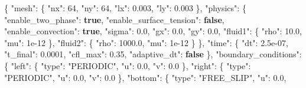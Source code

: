 \documentclass[
  10pt,
]{article}
\newenvironment{Shaded}{}{}
\newcommand{\DataTypeTok}[1]{\textcolor[rgb]{0.56,0.13,0.00}{#1}}
\newcommand{\DecValTok}[1]{\textcolor[rgb]{0.25,0.63,0.44}{#1}}
\newcommand{\FloatTok}[1]{\textcolor[rgb]{0.25,0.63,0.44}{#1}}
\newcommand{\FunctionTok}[1]{\textcolor[rgb]{0.02,0.16,0.49}{#1}}
\newcommand{\KeywordTok}[1]{\textcolor[rgb]{0.00,0.44,0.13}{\textbf{#1}}}
\newcommand{\StringTok}[1]{\textcolor[rgb]{0.25,0.44,0.63}{#1}}
\begin{document}
\begin{Shaded}
\begin{Highlighting}[]
\FunctionTok{\{}
  \DataTypeTok{"mesh"}\FunctionTok{:} \FunctionTok{\{}
    \DataTypeTok{"nx"}\FunctionTok{:} \DecValTok{64}\FunctionTok{,}
    \DataTypeTok{"ny"}\FunctionTok{:} \DecValTok{64}\FunctionTok{,}
    \DataTypeTok{"lx"}\FunctionTok{:} \FloatTok{0.003}\FunctionTok{,}
    \DataTypeTok{"ly"}\FunctionTok{:} \FloatTok{0.003}
  \FunctionTok{\},}
  \DataTypeTok{"physics"}\FunctionTok{:} \FunctionTok{\{}
    \DataTypeTok{"enable\_two\_phase"}\FunctionTok{:} \KeywordTok{true}\FunctionTok{,}
    \DataTypeTok{"enable\_surface\_tension"}\FunctionTok{:} \KeywordTok{false}\FunctionTok{,}
    \DataTypeTok{"enable\_convection"}\FunctionTok{:} \KeywordTok{true}\FunctionTok{,}
    \DataTypeTok{"sigma"}\FunctionTok{:} \FloatTok{0.0}\FunctionTok{,}
    \DataTypeTok{"gx"}\FunctionTok{:} \FloatTok{0.0}\FunctionTok{,}
    \DataTypeTok{"gy"}\FunctionTok{:} \FloatTok{0.0}\FunctionTok{,}
    \DataTypeTok{"fluid1"}\FunctionTok{:} \FunctionTok{\{}
      \DataTypeTok{"rho"}\FunctionTok{:} \FloatTok{10.0}\FunctionTok{,}
      \DataTypeTok{"mu"}\FunctionTok{:} \DecValTok{1e{-}12}
    \FunctionTok{\},}
    \DataTypeTok{"fluid2"}\FunctionTok{:} \FunctionTok{\{}
      \DataTypeTok{"rho"}\FunctionTok{:} \FloatTok{1000.0}\FunctionTok{,}
      \DataTypeTok{"mu"}\FunctionTok{:} \DecValTok{1e{-}12}
    \FunctionTok{\}}
  \FunctionTok{\},}
  \DataTypeTok{"time"}\FunctionTok{:} \FunctionTok{\{}
    \DataTypeTok{"dt"}\FunctionTok{:} \FloatTok{2.5e{-}07}\FunctionTok{,}
    \DataTypeTok{"t\_final"}\FunctionTok{:} \FloatTok{0.0001}\FunctionTok{,}
    \DataTypeTok{"cfl\_max"}\FunctionTok{:} \FloatTok{0.35}\FunctionTok{,}
    \DataTypeTok{"adaptive\_dt"}\FunctionTok{:} \KeywordTok{false}
  \FunctionTok{\},}
  \DataTypeTok{"boundary\_conditions"}\FunctionTok{:} \FunctionTok{\{}
    \DataTypeTok{"left"}\FunctionTok{:} \FunctionTok{\{}
      \DataTypeTok{"type"}\FunctionTok{:} \StringTok{"PERIODIC"}\FunctionTok{,}
      \DataTypeTok{"u"}\FunctionTok{:} \FloatTok{0.0}\FunctionTok{,}
      \DataTypeTok{"v"}\FunctionTok{:} \FloatTok{0.0}
    \FunctionTok{\},}
    \DataTypeTok{"right"}\FunctionTok{:} \FunctionTok{\{}
      \DataTypeTok{"type"}\FunctionTok{:} \StringTok{"PERIODIC"}\FunctionTok{,}
      \DataTypeTok{"u"}\FunctionTok{:} \FloatTok{0.0}\FunctionTok{,}
      \DataTypeTok{"v"}\FunctionTok{:} \FloatTok{0.0}
    \FunctionTok{\},}
    \DataTypeTok{"bottom"}\FunctionTok{:} \FunctionTok{\{}
      \DataTypeTok{"type"}\FunctionTok{:} \StringTok{"FREE\_SLIP"}\FunctionTok{,}
      \DataTypeTok{"u"}\FunctionTok{:} \FloatTok{0.0}\FunctionTok{,}

\end{Highlighting}
\end{Shaded}
\end{document}
